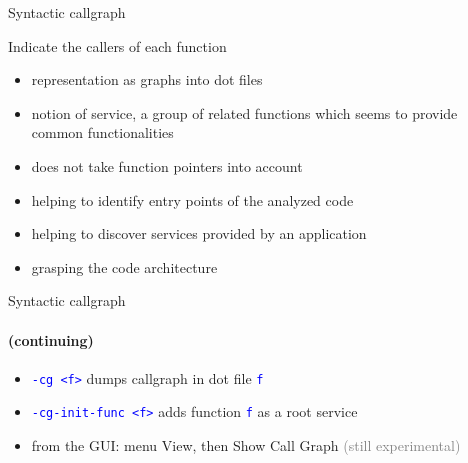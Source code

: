 \documentclass{beamer}
\newcommand{\orange}[1]{{\textcolor{frama-c-1}{#1}}}
\newcommand{\orangepale}[1]{{\textcolor{frama-c-2}{#1}}}
\newcommand{\vvert}[1]{{\textcolor{vert}{#1}}}
\newcommand{\bleu}[1]{{\textcolor{blue}{#1}}}
\newcommand{\gris}[1]{{\textcolor{gray}{#1}}}
\newcommand{\goup}{\vspace{-5pt}}
\newcommand{\code}[1]{\bleu{\texttt{#1}}}
\newcommand{\comment}[1]{\gris{(#1)}}
\newcommand{\continuing}{\framesubtitle{(continuing)}}
\newcommand{\intro}[1]{\begin{center}\vvert{#1}\end{center}}
\newenvironment{sect}[1]{\orange{#1}\begin{itemize}}{\end{itemize}}
\newenvironment{features}{\begin{sect}{Features}}{\end{sect}}
\newenvironment{whatitisgoodfor}{\begin{sect}{What is it good for}}{\end{sect}}
\newenvironment{howtouse}{\begin{sect}{How to use}}{\end{sect}}
\begin{document}

\begin{frame}{Syntactic callgraph}

\goup
\intro{Indicate the callers of each function}
\goup

\begin{features}
\item representation as \orangepale{graphs into dot files}
\item notion of \orangepale{service}, a group of related functions which seems
  to provide common functionalities
\end{features}\smallskip

\begin{sect}{Warning}
\item does not take function pointers into account
\end{sect}\smallskip

\begin{whatitisgoodfor}
\item helping to identify entry points of the analyzed code
\item helping to discover services provided by an application
\item grasping the code architecture
\end{whatitisgoodfor}

\end{frame}


\begin{frame}{Syntactic callgraph}
\continuing

\begin{howtouse}
\item \code{-cg <f>} dumps callgraph in dot file \code{f}
\item \code{-cg-init-func <f>} adds function \code{f} as a root service
\item from the GUI: menu \orangepale{View}, then \orangepale{Show Call Graph}
  \comment{still experimental}
\end{howtouse}

\end{frame}


\end{document}
